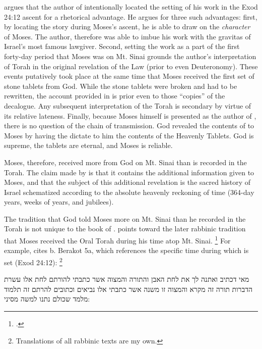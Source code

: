 \vanderkam argues that the author of \jub intentionally located the setting of his work in the Exod 24:12 ascent for a rhetorical advantage. He argues for three such advantages: first, by locating the story during Moses's ascent, he is able to draw on the \emph{character} of Moses. The author, therefore was able to imbue his work with the gravitas of Israel's most famous lawgiver. Second, setting the work as a part of the first forty-day period that Moses was on Mt. Sinai grounds the author's interpretation of Torah in the original revelation of the Law (prior to even Deuteronomy). These events putatively took place at the same time that Moses received the first set of stone tablets from God. While the stone tablets were broken and had to be rewritten, the account provided in \jub is prior even to those ``copies'' of the decalogue. Any subsequent interpretation of the Torah is secondary by virtue of its relative lateness. Finally, because Moses himself is presented as the author of \jub, there is no question of the chain of transmission. God revealed the contents of \jub to Moses by having the \ap dictate to him the contents of the Heavenly Tablets. God is supreme, the tablets are eternal, and Moses is reliable.

Moses, therefore, received more from God on Mt. Sinai than is recorded in the Torah. The claim made by \jub is that it contains the additional information given to Moses, and that the subject of this additional revelation is the sacred history of Israel schematized according to the absolute heavenly reckoning of time (364-day years, weeks of years, and jubilees).

The tradition that God told Moses more on Mt. Sinai than he recorded in the Torah is not unique to the book of \jub. \vanderkam points toward the later rabbinic tradition that Moses received the Oral Torah during his time atop Mt. Sinai.%
    \footnote{\cite[28--31]{vanderkam_metso-etal2010}.}
For example, \vanderkam cites b. Berakot 5a, which references the specific time during which \jub is set (Exod 24:12):%
    \footnote{Translations of all rabbinic texts are my own.}

\begin{aramaictext}
    מאי דכתיב ואתנה לך את לחת האבן והתורה והמצוה אשר כתבתי להורתם לחת אלו עשרת הדברות תורה זה מקרא והמצוה זו משנה אשר כתבתי אלו נביאים וכתובים להרתם זה תלמוד מלמד שכולם נתנו למשה מסיני: 
\end{aramaictext}

